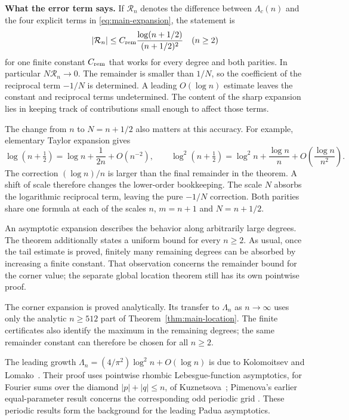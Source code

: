 \noindent\textbf{What the error term says.}
If $\mathcal{R}_n$ denotes the difference between $\Lambda_c(n)$ and the four
explicit terms in \eqref{eq:main-expansion}, the statement is
\[
 |\mathcal{R}_n|\leq C_{\rm rem}\frac{\log(n+1/2)}{(n+1/2)^2}
 \quad(n\geq2)
\]
for one finite constant $C_{\rm rem}$ that works for every degree and both
parities. In particular $N \mathcal{R}_n\to0$. The remainder is smaller than $1/N$, so the coefficient of
the reciprocal term $-1/N$ is determined. A leading
$O(\log n)$ estimate leaves the constant and reciprocal terms
undetermined. The content of the sharp expansion lies in keeping
track of contributions small enough to affect those terms.

The change from $n$ to $N=n+1/2$ also matters at this accuracy. For
example, elementary Taylor expansion gives
\[
 \log(n+\tfrac12)=\log n+\frac1{2n}+O(n^{-2}),
 \qquad
 \log^2(n+\tfrac12)=\log^2n+\frac{\log n}{n}
                         +O\!\left(\frac{\log n}{n^2}\right).
\]
The correction $(\log n)/n$ is larger than the final remainder in the
theorem. A shift of scale therefore changes the lower-order bookkeeping.
The scale $N$ absorbs the logarithmic reciprocal term, leaving the pure
$-1/N$ correction. Both parities share one formula at each of the scales
$n$, $m=n+1$ and $N=n+1/2$.

An asymptotic expansion describes the behavior along arbitrarily large
degrees. The theorem additionally states a uniform bound for every
$n\geq2$. As usual, once the tail estimate is proved, finitely many
remaining degrees can be absorbed by increasing a finite constant.
That observation concerns the remainder bound for the corner value;
the separate global location theorem still has its own pointwise proof.

The corner expansion is proved analytically. Its transfer to $\Lambda_n$
as $n\to\infty$ uses only the analytic $n\geq512$ part of
Theorem~\ref{thm:main-location}. The finite certificates also identify the
maximum in the remaining degrees; the same remainder constant can therefore
be chosen for all $n\geq2$.

The leading growth
$\Lambda_n=(4/\pi^2)\log^2n+O(\log n)$ is due to
Kolomoitsev and Lomako~\cite[Theorem~2.1 and the following Padua consequence]{KolomoitsevLomako2021}.
Their proof uses pointwise rhombic Lebesgue-function asymptotics, for Fourier sums over
the diamond $|p|+|q|\leq n$, of
Kuznetsova~\cite[Theorem~1]{Kuznetsova1995}; Pimenova's earlier equal-parameter
result concerns the corresponding odd periodic grid
\cite[Theorem~1]{Pimenova1979}. These periodic results form the background
for the leading Padua asymptotics.

